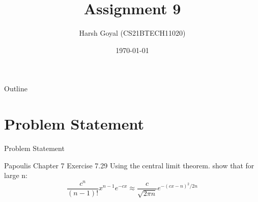 \documentclass{beamer}
\title{Assignment 9}
\author{Harsh Goyal (CS21BTECH11020)}
\date{\today}
\begin{document}
\begin{frame}
    \titlepage 
\end{frame}

\logo{}

\let\vec\textbf
\begin{frame}{Outline}
    \tableofcontents
\end{frame}


\section{Problem Statement}
\begin{frame}{Problem Statement}

    \begin{block}{Papoulis Chapter 7 Exercise 7.29}
    Using the central limit theorem. show that for large n:
        \begin{equation}
            \frac{c^n}{(n-1)!}x^{n-1}e^{-cx} \approx \frac{c}{\sqrt{2\pi n}}e^{-(cx-n)^2/2n}
        \end{equation}
    \end{block}
\end{frame}
\end{document}

